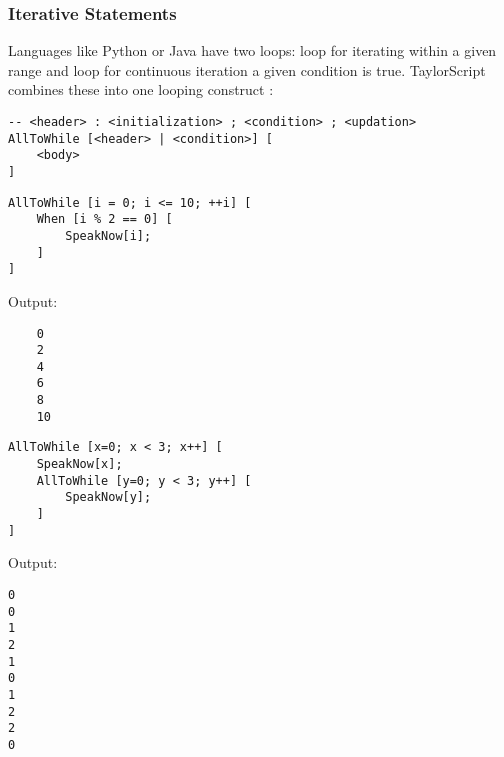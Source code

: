 \subsubsection{Iterative Statements}
Languages like Python or Java have two loops:  loop for iterating within a given range and  loop for continuous iteration  a given condition is true. TaylorScript combines these into one looping construct :
\begin{verbatim}
-- <header> : <initialization> ; <condition> ; <updation>
AllToWhile [<header> | <condition>] [
    <body>
]
\end{verbatim}
\begin{verbatim}
AllToWhile [i = 0; i <= 10; ++i] [
    When [i % 2 == 0] [
        SpeakNow[i];
    ]
]
\end{verbatim}
Output:
\begin{verbatim}
    0
    2
    4
    6
    8
    10
\end{verbatim}
\begin{verbatim}
AllToWhile [x=0; x < 3; x++] [
    SpeakNow[x];
    AllToWhile [y=0; y < 3; y++] [
        SpeakNow[y];
    ]
]
\end{verbatim}
Output:
\begin{verbatim}
0
0
1
2
1
0
1
2
2
0
\end{verbatim}
